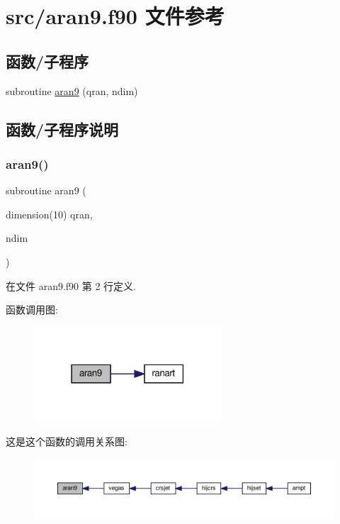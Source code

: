 \hypertarget{aran9_8f90}{}\section{src/aran9.f90 文件参考}
\label{aran9_8f90}
\subsection*{函数/子程序}
\begin{DoxyCompactItemize}
\item 
subroutine \mbox{\hyperlink{aran9_8f90_acd4def10a77f1c55a87289e71b42ea9a}{aran9}} (qran, ndim)
\end{DoxyCompactItemize}


\subsection{函数/子程序说明}
\mbox{\label{aran9_8f90_acd4def10a77f1c55a87289e71b42ea9a}} 
\subsubsection{\texorpdfstring{aran9()}{aran9()}}
{\footnotesize\ttfamily subroutine aran9 (\begin{DoxyParamCaption}\item[{dimension(10)}]{qran,  }\item[{}]{ndim }\end{DoxyParamCaption})}



在文件 aran9.\+f90 第 2 行定义.

函数调用图\+:
\nopagebreak
\begin{figure}[H]
\begin{center}
\leavevmode
\includegraphics[width=198pt]{aran9_8f90_acd4def10a77f1c55a87289e71b42ea9a_cgraph}
\end{center}
\end{figure}
这是这个函数的调用关系图\+:
\nopagebreak
\begin{figure}[H]
\begin{center}
\leavevmode
\includegraphics[width=350pt]{aran9_8f90_acd4def10a77f1c55a87289e71b42ea9a_icgraph}
\end{center}
\end{figure}
